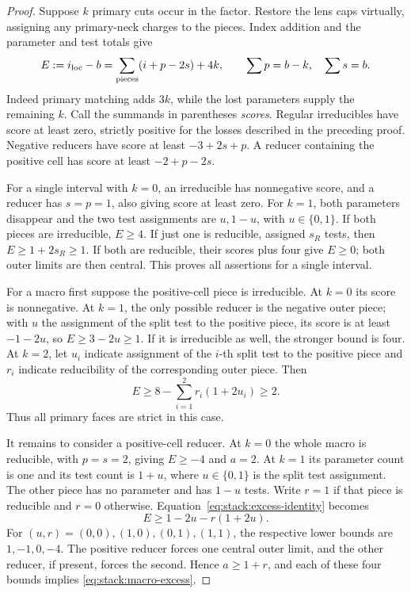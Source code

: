 \begin{proof}
Suppose \(k\) primary cuts occur in the factor.  Restore the lens
caps virtually, assigning any primary-neck charges to the pieces.
Index addition and the parameter and test totals give
\begin{equation}
 E:=i_{\rm loc}-b
 =\sum_{\rm pieces}(i+p-2s)+4k,
 \qquad \sum p=b-k,\quad\sum s=b.
\label{eq:stack:excess-identity}
\end{equation}
Indeed primary matching adds \(3k\), while the lost parameters
supply the remaining \(k\).  Call the summands in parentheses
\emph{scores}.  Regular irreducibles have score at least zero,
strictly positive for the losses described in the preceding proof.
Negative reducers have score at least
\(-3+2s+p\).  A reducer containing the positive cell has score
at least \(-2+p-2s\).

For a single interval with \(k=0\), an irreducible has nonnegative
score, and a reducer has \(s=p=1\), also giving score at least zero.
For \(k=1\), both parameters disappear and the two test assignments
are \(u,1-u\), with \(u\in\{0,1\}\).  If both pieces are
irreducible, \(E\ge4\).  If just one is reducible, assigned
\(s_R\) tests, then \(E\ge1+2s_R\ge1\).  If both are
reducible, their scores plus four give \(E\ge0\); both outer
limits are then central.  This proves all assertions for a single
interval.

For a macro first suppose the positive-cell piece is irreducible.
At \(k=0\) its score is nonnegative.  At \(k=1\), the only
possible reducer is the negative outer piece; with \(u\) the
assignment of the split test to the positive piece, its score is
at least \(-1-2u\), so \(E\ge3-2u\ge1\).  If it is
irreducible as well, the stronger bound is four.  At \(k=2\),
let \(u_i\) indicate assignment of the \(i\)-th split test to
the positive piece and \(r_i\) indicate reducibility of the
corresponding outer piece.  Then
\[
 E\ge8-\sum_{i=1}^2r_i(1+2u_i)\ge2.
\]
Thus all primary faces are strict in this case.

It remains to consider a positive-cell reducer.  At \(k=0\) the
whole macro is reducible, with \(p=s=2\), giving \(E\ge-4\)
and \(a=2\).  At \(k=1\) its parameter count is one and its
test count is \(1+u\), where \(u\in\{0,1\}\) is the split
test assignment.  The other piece has no parameter and has
\(1-u\) tests.  Write \(r=1\) if that piece is reducible and
\(r=0\) otherwise.  Equation~\eqref{eq:stack:excess-identity}
becomes
\[
 E\ge1-2u-r(1+2u).
\]
For \((u,r)=(0,0),(1,0),(0,1),(1,1)\), the respective lower
bounds are \(1,-1,0,-4\).  The positive reducer forces one central
outer limit, and the other reducer, if present, forces the second.
Hence \(a\ge1+r\), and each of these four bounds implies
\eqref{eq:stack:macro-excess}.


\end{proof}
